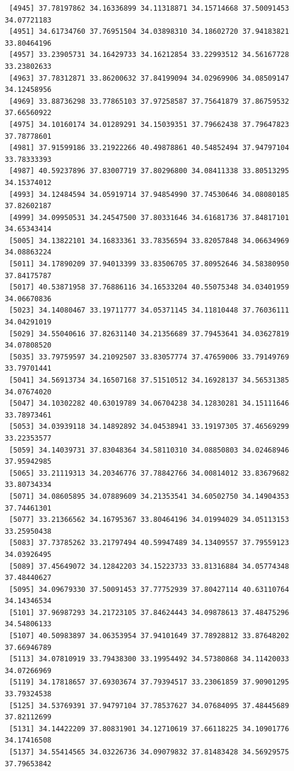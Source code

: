 \documentclass[
  letterpaper,
  DIV=11,
  numbers=noendperiod]{scrartcl}
\begin{document}
\begin{verbatim}
 [4945] 37.78197862 34.16336899 34.11318871 34.15714668 37.50091453 34.07721183
 [4951] 34.61734760 37.76951504 34.03898310 34.18602720 37.94183821 33.80464196
 [4957] 33.23905731 34.16429733 34.16212854 33.22993512 34.56167728 33.23802633
 [4963] 37.78312871 33.86200632 37.84199094 34.02969906 34.08509147 34.12458956
 [4969] 33.88736298 33.77865103 37.97258587 37.75641879 37.86759532 37.66560922
 [4975] 34.10160174 34.01289291 34.15039351 37.79662438 37.79647823 37.78778601
 [4981] 37.91599186 33.21922266 40.49878861 40.54852494 37.94797104 33.78333393
 [4987] 40.59237896 37.83007719 37.80296800 34.08411338 33.80513295 34.15374012
 [4993] 34.12484594 34.05919714 37.94854990 37.74530646 34.08080185 37.82602187
 [4999] 34.09950531 34.24547500 37.80331646 34.61681736 37.84817101 34.65343414
 [5005] 34.13822101 34.16833361 33.78356594 33.82057848 34.06634969 34.08863224
 [5011] 34.17890209 37.94013399 33.83506705 37.80952646 34.58380950 37.84175787
 [5017] 40.53871958 37.76886116 34.16533204 40.55075348 34.03401959 34.06670836
 [5023] 34.14080467 33.19711777 34.05371145 34.11810448 37.76036111 34.04291019
 [5029] 34.55040616 37.82631140 34.21356689 37.79453641 34.03627819 34.07808520
 [5035] 33.79759597 34.21092507 33.83057774 37.47659006 33.79149769 33.79701441
 [5041] 34.56913734 34.16507168 37.51510512 34.16928137 34.56531385 34.07674020
 [5047] 34.10302282 40.63019789 34.06704238 34.12830281 34.15111646 33.78973461
 [5053] 34.03939118 34.14892892 34.04538941 33.19197305 37.46569299 33.22353577
 [5059] 34.14039731 37.83048364 34.58110310 34.08850803 34.02468946 37.95942985
 [5065] 33.21119313 34.20346776 37.78842766 34.00814012 33.83679682 33.80734334
 [5071] 34.08605895 34.07889609 34.21353541 34.60502750 34.14904353 37.74461301
 [5077] 33.21366562 34.16795367 33.80464196 34.01994029 34.05113153 33.25950438
 [5083] 37.73785262 33.21797494 40.59947489 34.13409557 37.79559123 34.03926495
 [5089] 37.45649072 34.12842203 34.15223733 33.81316884 34.05774348 37.48440627
 [5095] 34.09679330 37.50091453 37.77752939 37.80427114 40.63110764 34.14346534
 [5101] 37.96987293 34.21723105 37.84624443 34.09878613 37.48475296 34.54806133
 [5107] 40.50983897 34.06353954 37.94101649 37.78928812 33.87648202 37.66946789
 [5113] 34.07810919 33.79438300 33.19954492 34.57380868 34.11420033 34.07266969
 [5119] 34.17818657 37.69303674 37.79394517 33.23061859 37.90901295 33.79324538
 [5125] 34.53769391 37.94797104 37.78537627 34.07684095 37.48445689 37.82112699
 [5131] 34.14422209 37.80831901 34.12710619 37.66118225 34.10901776 34.17416508
 [5137] 34.55414565 34.03226736 34.09079832 37.81483428 34.56929575 37.79653842

\end{verbatim}
\end{document}
